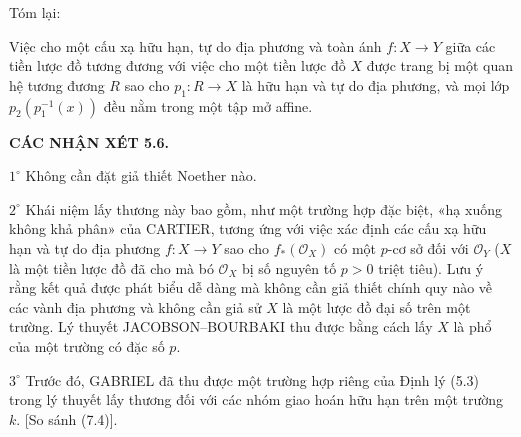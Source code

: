 Tóm lại:

 Việc cho một cấu xạ hữu hạn, tự do địa phương và toàn ánh
$f:X\to Y$ giữa các tiền lược đồ tương đương với việc cho một tiền lược đồ
$X$ được trang bị một quan hệ tương đương $R$ sao cho $p_1:R\to X$ là hữu hạn
và tự do địa phương, và mọi lớp $p_2(p_1^{-1}(x))$ đều nằm trong một tập mở
affine.

\medskip
\noindent\textbf{CÁC NHẬN XÉT 5.6.}

\smallskip
\noindent $1^\circ$ Không cần đặt giả thiết Noether nào.

\smallskip
\noindent $2^\circ$ Khái niệm lấy thương này bao gồm, như một trường hợp đặc
biệt, «hạ xuống không khả phân» của CARTIER, tương ứng với việc xác định các
cấu xạ hữu hạn và tự do địa phương $f:X\to Y$ sao cho
$f_*(\mathcal O_X)$ có một $p$-cơ sở đối với $\mathcal O_Y$ ($X$ là một tiền
lược đồ đã cho mà bó $\mathcal O_X$ bị số nguyên tố $p>0$ triệt tiêu). Lưu ý
rằng kết quả được phát biểu dễ dàng mà không cần giả thiết chính quy nào về
các vành địa phương và không cần giả sử $X$ là một lược đồ đại số trên một
trường. Lý thuyết JACOBSON--BOURBAKI thu được bằng cách lấy $X$ là phổ của
một trường có đặc số $p$.

\smallskip
\noindent $3^\circ$ Trước đó, GABRIEL đã thu được một trường hợp riêng của
Định lý (5.3) trong lý thuyết lấy thương đối với các nhóm giao hoán hữu hạn
trên một trường $k$. [So sánh (7.4)].



